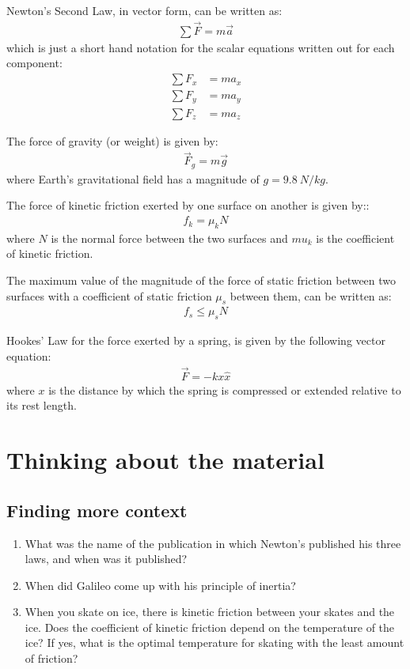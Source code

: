 \begin{importantEquations}
Newton's Second Law, in vector form, can be written as:
\begin{align*}
\sum \vec F = m\vec a
\end{align*}
which is just a short hand notation for the scalar equations written out for each component:
\begin{align*}
\sum F_x &= ma_x \\
\sum F_y &= ma_y \\
\sum F_z &= ma_z
\end{align*}

The force of gravity (or weight) is given by:
\begin{align*}
\vec F_g = m\vec g
\end{align*}
where Earth's gravitational field has a magnitude of $g=\SI{9.8}{N/kg}$.

The force of kinetic friction exerted by one surface on another is given by::
\begin{align*}
f_k=\mu_kN
\end{align*}
where $N$ is the normal force between the two surfaces and $mu_k$ is the coefficient of kinetic friction.

The maximum value of the magnitude of the force of static friction between two surfaces with a coefficient of static friction $\mu_s$ between them, can be written as:
\begin{align*}
f_s\leq\mu_sN
\end{align*}

Hookes' Law for the force exerted by a spring, is given by the following vector equation:
\begin{align*}
\vec F = -kx \hat x
\end{align*}
where $x$ is the distance by which the spring is compressed or extended relative to its rest length.
\end{importantEquations}

\section{Thinking about the material}

\subsection{Finding more context}
\begin{enumerate}
\item What was the name of the publication in which Newton's published his three laws, and when was it published?
\item When did Galileo come up with his principle of inertia?
\item When you skate on ice, there is kinetic friction between your skates and the ice. Does the coefficient of kinetic friction depend on the temperature of the ice? If yes, what is the optimal temperature for skating with the least amount of friction?
\end{enumerate}

